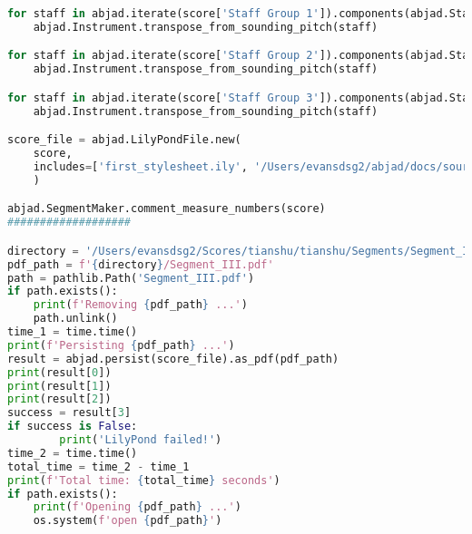 \begin{lstlisting}[language=Python, caption=Tianshu Segment\_III]
for staff in abjad.iterate(score['Staff Group 1']).components(abjad.Staff):
    abjad.Instrument.transpose_from_sounding_pitch(staff)

for staff in abjad.iterate(score['Staff Group 2']).components(abjad.Staff):
    abjad.Instrument.transpose_from_sounding_pitch(staff)

for staff in abjad.iterate(score['Staff Group 3']).components(abjad.Staff):
    abjad.Instrument.transpose_from_sounding_pitch(staff)

score_file = abjad.LilyPondFile.new(
    score,
    includes=['first_stylesheet.ily', '/Users/evansdsg2/abjad/docs/source/_stylesheets/abjad.ily'],
    )

abjad.SegmentMaker.comment_measure_numbers(score)
###################

directory = '/Users/evansdsg2/Scores/tianshu/tianshu/Segments/Segment_III'
pdf_path = f'{directory}/Segment_III.pdf'
path = pathlib.Path('Segment_III.pdf')
if path.exists():
    print(f'Removing {pdf_path} ...')
    path.unlink()
time_1 = time.time()
print(f'Persisting {pdf_path} ...')
result = abjad.persist(score_file).as_pdf(pdf_path)
print(result[0])
print(result[1])
print(result[2])
success = result[3]
if success is False:
        print('LilyPond failed!')
time_2 = time.time()
total_time = time_2 - time_1
print(f'Total time: {total_time} seconds')
if path.exists():
    print(f'Opening {pdf_path} ...')
    os.system(f'open {pdf_path}')
\end{lstlisting}
\doublespace

